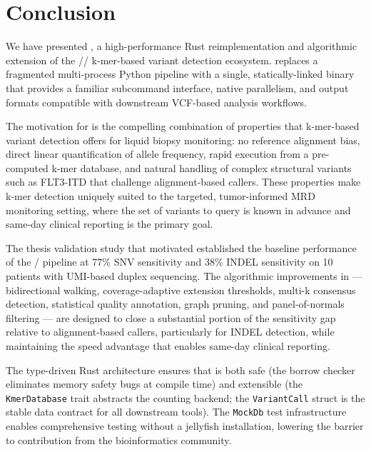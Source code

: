 \section{Conclusion}
\label{sec:conclusion}

We have presented \kmerdet{}, a high-performance Rust reimplementation and
algorithmic extension of the \km{}/\kmtools{}/\kam{} k-mer-based variant
detection ecosystem.  \kmerdet{} replaces a fragmented multi-process Python
pipeline with a single, statically-linked binary that provides a familiar
subcommand interface, native parallelism, and output formats compatible with
downstream VCF-based analysis workflows.

The motivation for \kmerdet{} is the compelling combination of properties that
k-mer-based variant detection offers for liquid biopsy \ctDNA{} monitoring: no
reference alignment bias, direct linear quantification of allele frequency,
rapid execution from a pre-computed k-mer database, and natural handling of
complex structural variants such as FLT3-ITD that challenge alignment-based
callers.  These properties make k-mer detection uniquely suited to the targeted,
tumor-informed MRD monitoring setting, where the set of variants to query is
known in advance and same-day clinical reporting is the primary goal.

The thesis validation study that motivated \kmerdet{} established the baseline
performance of the \km{}/\kam{} pipeline at 77\% SNV sensitivity and 38\% INDEL
sensitivity on 10 patients with UMI-based duplex sequencing.  The algorithmic
improvements in \kmerdet{} --- bidirectional walking, coverage-adaptive extension
thresholds, multi-k consensus detection, statistical quality annotation, graph
pruning, and panel-of-normals filtering --- are designed to close a substantial
portion of the sensitivity gap relative to alignment-based callers, particularly
for INDEL detection, while maintaining the speed advantage that enables same-day
clinical reporting.

The type-driven Rust architecture ensures that \kmerdet{} is both safe (the
borrow checker eliminates memory safety bugs at compile time) and extensible (the
\texttt{KmerDatabase} trait abstracts the counting backend; the \texttt{VariantCall}
struct is the stable data contract for all downstream tools).  The
\texttt{MockDb} test infrastructure enables comprehensive testing without a
jellyfish installation, lowering the barrier to contribution from the
bioinformatics community.

